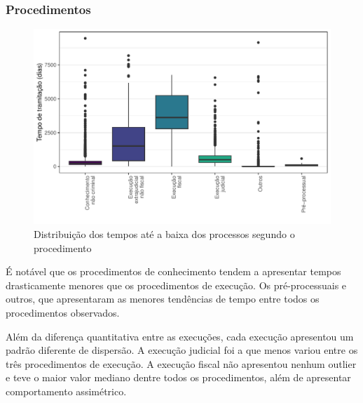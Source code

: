 \subsubsection{Procedimentos}\label{sec:procedimento}
\begin{figure}[H]
    \centering
    \caption{Distribuição dos tempos até a baixa dos processos segundo o procedimento}
    \label{fig:procedimentos_tempo}
    \includegraphics[scale=.9]{imagens/procedimento_tempo.pdf}
\end{figure}

É notável que os procedimentos de conhecimento tendem a apresentar tempos drasticamente menores que os procedimentos de execução. Os pré-processuais e outros, que apresentaram as menores tendências de tempo entre todos os procedimentos observados.

Além da diferença quantitativa entre as execuções, cada execução apresentou um padrão diferente de dispersão. A execução judicial foi a que menos variou entre os três procedimentos de execução. A execução fiscal não apresentou nenhum outlier e teve o maior valor mediano dentre todos os procedimentos, além de apresentar comportamento assimétrico.


